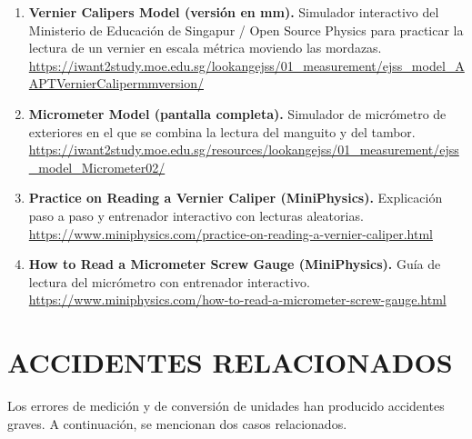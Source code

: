 \documentclass[12pt,a4paper]{article}
\begin{document}
\begin{enumerate}[label=\textbf{\arabic*.}]
	\item \textbf{Vernier Calipers Model (versión en mm).} Simulador interactivo
	      del Ministerio de Educación de Singapur / Open Source Physics para
	      practicar la
	      lectura de un vernier en escala métrica moviendo las mordazas. \\
	      \url{https://iwant2study.moe.edu.sg/lookangejss/01_measurement/ejss_model_AAPTVernierCalipermmversion/}\\[-4pt]
	\item \textbf{Micrometer Model (pantalla completa).} Simulador de micrómetro
	      de exteriores en el que se combina la lectura del manguito y del tambor.
	      \\
	      \url{https://iwant2study.moe.edu.sg/resources/lookangejss/01_measurement/ejss_model_Micrometer02/}\\[-4pt]
	\item \textbf{Practice on Reading a Vernier Caliper (MiniPhysics).}
	      Explicación paso a paso y entrenador interactivo con lecturas
	      aleatorias. \\
	      \url{https://www.miniphysics.com/practice-on-reading-a-vernier-caliper.html}\\[-4pt]
	\item \textbf{How to Read a Micrometer Screw Gauge (MiniPhysics).} Guía de
	      lectura del micrómetro con entrenador interactivo. \\
	      \url{https://www.miniphysics.com/how-to-read-a-micrometer-screw-gauge.html}
\end{enumerate}

\section{ACCIDENTES RELACIONADOS}

Los errores de medición y de conversión de unidades han producido accidentes
graves. A continuación, se mencionan dos casos relacionados.
\end{document}
